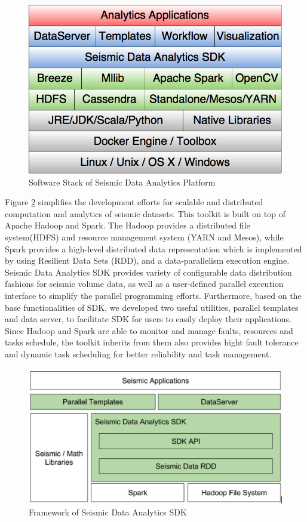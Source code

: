 \begin{figure}[h]
\centering
\includegraphics[scale=0.4]{figures/sdk_swstack.png}
\caption{Software Stack of Seismic Data Analytics Platform}
\label{sdk_swstack}
\end{figure}

Figure \ref{sdk_framework} simplifies the development efforts for scalable and distributed computation and analytics of seismic datasets. This toolkit is built on top of Apache Hadoop and Spark. The Hadoop provides a distributed file system(HDFS) and resource management system (YARN and Mesos), while Spark provides a high-level distributed data representation which is implemented by using Resilient Data Sets (RDD),  and a data-parallelism execution engine. Seismic Data Analytics SDK provides variety of configurable data distribution fashions for seismic volume data, as well as a user-defined parallel execution interface to simplify the parallel programming efforts. Furthermore, based on the base functionalities of SDK, we developed two useful utilities, parallel templates and data server, to facilitate SDK for users to easily deploy their applications. Since Hadoop and Spark are able to monitor and manage faults, resources and tasks schedule, the toolkit inherits from them also provides hight fault tolerance and dynamic task scheduling for better reliability and task management.

\begin{figure}[h]
\centering
\includegraphics[scale=0.6]{figures/sdk_framework.png}
\caption{Framework of Seismic Data Analytics SDK}
\label{sdk_framework}
\end{figure}



